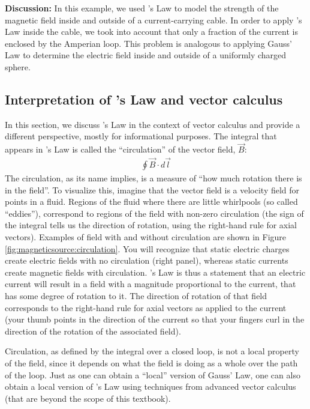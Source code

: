 \begin{example}
\textbf{Discussion:} In this example, we used \ampere's Law to model the strength of the magnetic field inside and outside of a current-carrying cable. In order to apply \ampere's Law inside the cable, we took into account that only a fraction of the current is enclosed by the Amperian loop. This problem is analogous to applying Gauss' Law to determine the electric field inside and outside of a uniformly charged sphere. 
\end{example}

\subsection{Interpretation of \ampere's Law and vector calculus} 
\label{sec:magneticsource:interpretation}
In this section, we discuss \ampere's Law in the context of vector calculus and provide a different perspective, mostly for informational purposes. The integral that appears in \ampere's Law is called the ``circulation'' of the vector field, $\vec B$:
\begin{align*}
\oint \vec B \cdot d\vec l
\end{align*}
The circulation, as its name implies, is a measure of ``how much rotation there is in the field''. To visualize this, imagine that the vector field is a velocity field for points in a fluid. Regions of the fluid where there are little whirlpools (so called ``eddies''), correspond to regions of the field with non-zero circulation (the sign of the integral tells us the direction of rotation, using the right-hand rule for axial vectors). Examples of field with and without circulation are shown in Figure \ref{fig:magneticsource:circulation}. You will recognize that static electric charges create electric fields with no circulation (right panel), whereas static currents create magnetic fields with circulation.
\ampere's Law is thus a statement that an electric current will result in a field with a magnitude proportional to the current, that has some degree of rotation to it. The direction of rotation of that field corresponds to the right-hand rule for axial vectors as applied to the current (your thumb points in the direction of the current so that your fingers curl in the direction of the rotation of the associated field). 

Circulation, as defined by the integral over a closed loop, is not a local property of the field, since it depends on what the field is doing as a whole over the path of the loop. Just as one can obtain a ``local'' version of  Gauss' Law, one can also obtain a local version of \ampere's Law using techniques from advanced vector calculus (that are beyond the scope of this textbook).

